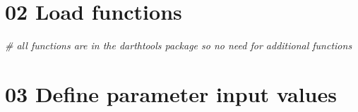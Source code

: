 \documentclass[
]{article}
\newenvironment{Shaded}{\begin{snugshade}}{\end{snugshade}}
\newcommand{\CommentTok}[1]{\textcolor[rgb]{0.56,0.35,0.01}{\textit{#1}}}
\begin{document}
\hypertarget{load-functions}{%
\section{02 Load functions}\label{load-functions}}

\begin{Shaded}
\begin{Highlighting}[]
\CommentTok{# all functions are in the darthtools package so no need for additional functions}
\end{Highlighting}
\end{Shaded}

\hypertarget{define-parameter-input-values}{%
\section{03 Define parameter input
values}\label{define-parameter-input-values}}
\end{document}
